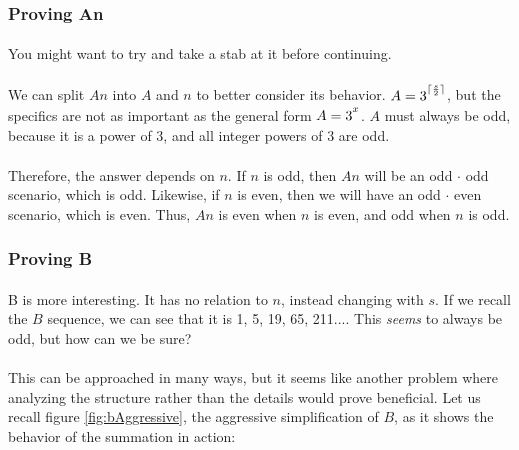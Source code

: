 \documentclass[12pt,letterpaper]{article}
\begin{document}
		\subsubsection{Proving An}
		
			\paragraph{} You might want to try and take a stab at it before continuing.
		
			\paragraph{} We can split $An$ into $A$ and $n$ to better consider its behavior. $A = 3\strut^{\lceil \frac{s}{2} \rceil}$, but the specifics are not as important as the general form $A = 3\strut^x$. $A$ must always be odd, because it is a power of 3, and all integer powers of 3 are odd.
			
			\paragraph{} Therefore, the answer depends on $n$. If $n$ is odd, then $An$ will be an odd $\cdot$ odd scenario, which is odd. Likewise, if $n$ is even, then we will have an odd $\cdot$ even scenario, which is even. Thus, $An$ is even when $n$ is even, and odd when $n$ is odd.
			
		\subsubsection{Proving B}
		
			\paragraph{} B is more interesting. It has no relation to $n$, instead changing with $s$. If we recall the $B$ sequence, we can see that it is 1, 5, 19, 65, 211.... This \textit{seems} to always be odd, but how can we be sure?
			
			\paragraph{} This can be approached in many ways, but it seems like another problem where analyzing the structure rather than the details would prove beneficial. Let us recall figure \ref{fig:bAggressive}, the aggressive simplification of $B$, as it shows the behavior of the summation in action:
			
\end{document}
